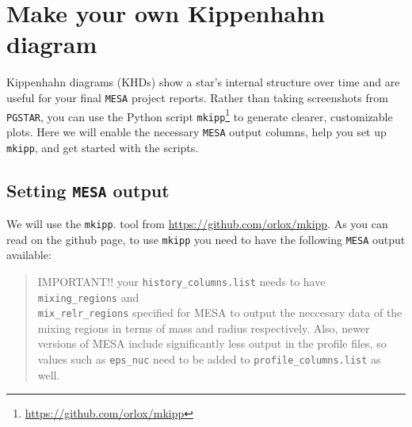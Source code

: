 \documentclass[11pt,a4paper]{article}
\begin{document}





\section{Make your own Kippenhahn diagram}\label{sec:make_kippenhahn}

Kippenhahn diagrams (KHDs) show a star’s internal structure over time and are useful for your final \texttt{MESA} project reports. Rather than taking screenshots from \texttt{PGSTAR}, you can use the Python script \texttt{mkipp}\footnote{\url{https://github.com/orlox/mkipp}} to generate clearer, customizable plots. 
Here we will enable the necessary \texttt{MESA} output columns,  help you set up \texttt{mkipp}, and get started with the scripts.

\subsection{Setting \texttt{MESA} output}




We will use the \texttt{mkipp}. tool from \url{https://github.com/orlox/mkipp}.
As you can read on the github page, to use \texttt{mkipp} you need to have the following \texttt{MESA} output available:\\
%
\begin{quote}
IMPORTANT!! your \texttt{history\_columns.list} needs to have \texttt{mixing\_regions} and \\
 \texttt{mix\_relr\_regions} specified for MESA to output the neccesary data of the mixing regions in terms of mass and radius respectively. Also, newer versions of MESA include significantly less output in the profile files, so values such as \texttt{eps\_nuc} need to be added to \texttt{profile\_columns.list} as well.
\end{quote}
\end{document}
